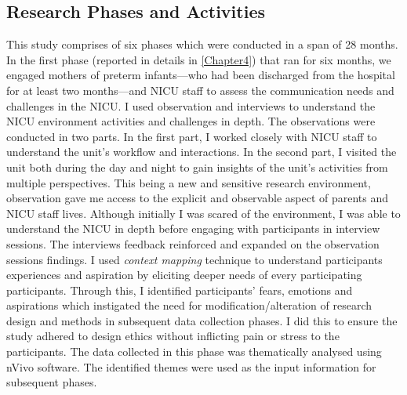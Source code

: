 \subsection{ Research Phases and Activities} \label{Activities}
This study comprises of six phases which were conducted in a span of 28 months. In the first phase (reported in details in \ref{Chapter4}) that ran for six months, we engaged mothers of preterm infants---who had been discharged from the hospital for at least two months---and NICU staff to assess the communication needs and challenges in the NICU. I used observation and interviews to understand the NICU environment activities and challenges in depth. The observations were conducted in two parts. In the first part, I worked closely with NICU staff to understand the unit's workflow and interactions. In the second part, I visited the unit both during the day and night to gain insights of the unit's activities from multiple perspectives. This being a new and sensitive research environment, observation gave me access to the explicit and observable aspect of parents and NICU staff lives. Although initially I was scared of the environment, I was able to understand the NICU in depth before engaging with participants in interview sessions. The interviews feedback reinforced and expanded on the observation sessions findings. I used \textit{context mapping} \citep{Offermans2014} technique to understand participants experiences and aspiration by eliciting deeper needs of every participating participants. Through this, I identified participants' fears, emotions and aspirations which instigated the need for modification/alteration of research design and methods in subsequent data collection phases. I did this to ensure the study adhered to design ethics without inflicting pain or stress to the participants. The data collected in this phase was thematically analysed using nVivo software. The identified themes were used as the input information for subsequent phases.

